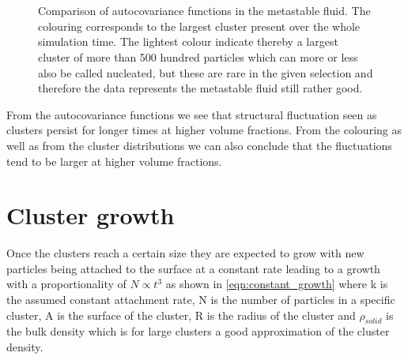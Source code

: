 \begin{figure}[ht]
\begin{center}
 \hspace{0.5cm}
 \\
 \hspace{0.5cm}
 \\
\caption[Autocovariance functions of largest cluster in the metastable fluid]{Comparison of autocovariance functions in the metastable fluid. The colouring corresponds to the largest cluster present over the whole simulation time. The lightest colour indicate thereby a largest cluster of more than 500 hundred particles which can more or less also be called nucleated, but these are rare in the given selection and therefore the data represents the metastable fluid still rather good.}
\label{fig:acf}
\end{center}
\end{figure}

From the autocovariance functions we see that structural fluctuation seen as clusters persist for longer times at higher volume fractions. From the colouring as well as from the cluster distributions we can also conclude that the fluctuations tend to be larger at higher volume fractions.



\section{Cluster growth}
\label{sec:cluster_growth}
Once the clusters reach a certain size they are expected to grow with new particles being attached to the surface at a constant rate leading to a growth with a proportionality of $N \propto t^3$ as shown in \autoref{eqn:constant_growth} where k is the assumed constant attachment rate, N is the number of particles in a specific cluster, A is the surface of the cluster, R is the radius of the cluster and $\rho_{solid}$ is the bulk density which is for large clusters a good approximation of the cluster density.\\

